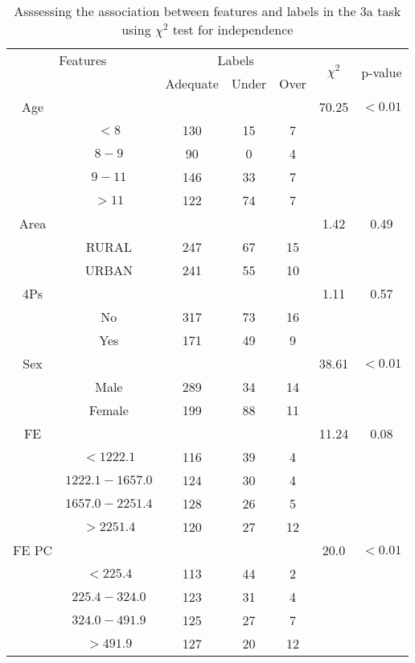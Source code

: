 \begin{table}[!htb]
\centering
\caption{Asssessing the association between features and labels in the 3a task using $\chi^2$ test for independence}
\label{tab:chitest_3a}
\begin{tabular}{c c | c c c| c | c}
\hline
\multicolumn{2}{c|}{Features}& \multicolumn{3}{c|}{Labels}& \multirow{2}{*}{$\chi^2$} & \multirow{2}{*}{p-value}\\ 
& & Adequate & Under & Over & & \\ 
\hline
Age &  &  &  & & 70.25 & $< 0.01$ \\ 
& $< 8$ & 130 & 15 & 7& & \\ 
& $8-9$ & 90 & 0 & 4& & \\ 
& $9-11$ & 146 & 33 & 7& & \\ 
& $> 11$ & 122 & 74 & 7& & \\ 
\hline 
Area &  &  &  & & 1.42 & 0.49 \\ 
& RURAL & 247 & 67 & 15& & \\ 
& URBAN & 241 & 55 & 10& & \\ 
\hline 
4Ps &  &  &  & & 1.11 & 0.57 \\ 
& No & 317 & 73 & 16& & \\ 
& Yes & 171 & 49 & 9& & \\ 
\hline 
Sex &  &  &  & & 38.61 & $< 0.01$ \\ 
& Male & 289 & 34 & 14& & \\ 
& Female & 199 & 88 & 11& & \\ 
\hline 
FE &  &  &  & & 11.24 & 0.08 \\ 
& $< 1222.1$ & 116 & 39 & 4& & \\ 
& $1222.1-1657.0$ & 124 & 30 & 4& & \\ 
& $1657.0-2251.4$ & 128 & 26 & 5& & \\ 
& $> 2251.4$ & 120 & 27 & 12& & \\ 
\hline 
FE PC &  &  &  & & 20.0 & $< 0.01$ \\ 
& $< 225.4$ & 113 & 44 & 2& & \\ 
& $225.4-324.0$ & 123 & 31 & 4& & \\ 
& $324.0-491.9$ & 125 & 27 & 7& & \\ 
& $> 491.9$ & 127 & 20 & 12& & \\ 
\hline 
\end{tabular}
\end{table}
